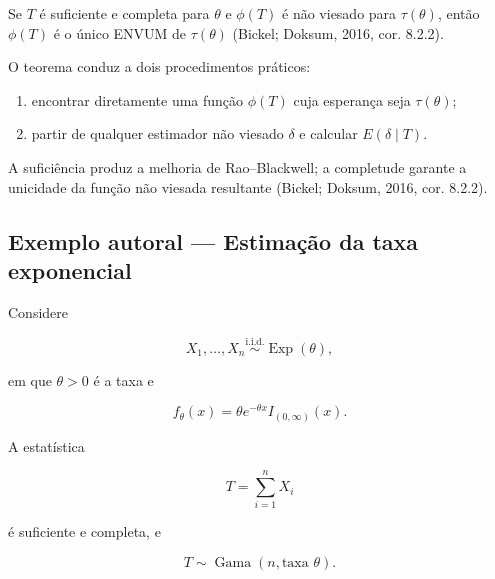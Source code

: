 \documentclass[
  letterpaper,
  DIV=11,
  numbers=noendperiod]{scrreprt}
\providecommand{\tightlist}{%
  \setlength{\itemsep}{0pt}\setlength{\parskip}{0pt}}\usepackage{longtable,booktabs,array}
\begin{document}
\begin{tcolorbox}[enhanced jigsaw, colback=white, leftrule=.75mm, colbacktitle=quarto-callout-important-color!10!white, breakable, titlerule=0mm, bottomtitle=1mm, title=\textcolor{quarto-callout-important-color}{\faExclamation}\hspace{0.5em}{Teorema --- Lehmann--Scheffé}, colframe=quarto-callout-important-color-frame, toprule=.15mm, opacityback=0, bottomrule=.15mm, opacitybacktitle=0.6, arc=.35mm, toptitle=1mm, rightrule=.15mm, coltitle=black, left=2mm]

Se \(T\) é suficiente e completa para \(\theta\) e \(\phi(T)\) é não
viesado para \(\tau(\theta)\), então \(\phi(T)\) é o único ENVUM de
\(\tau(\theta)\) (Bickel; Doksum, 2016, cor. 8.2.2).

\end{tcolorbox}

O teorema conduz a dois procedimentos práticos:

\begin{enumerate}
\def\labelenumi{\arabic{enumi}.}
\tightlist
\item
  encontrar diretamente uma função \(\phi(T)\) cuja esperança seja
  \(\tau(\theta)\);
\item
  partir de qualquer estimador não viesado \(\delta\) e calcular
  \(E(\delta\mid T)\).
\end{enumerate}

A suficiência produz a melhoria de Rao--Blackwell; a completude garante
a unicidade da função não viesada resultante (Bickel; Doksum, 2016, cor.
8.2.2).

\subsection*{Exemplo autoral --- Estimação da taxa
exponencial}\label{exemplo-autoral-estimauxe7uxe3o-da-taxa-exponencial}

Considere

\[X_1,\ldots,X_n
\overset{\mathrm{i.i.d.}}{\sim}
\operatorname{Exp}(\theta),\]

em que \(\theta>0\) é a taxa e

\[f_\theta(x)=\theta e^{-\theta x}I_{(0,\infty)}(x).\]

A estatística

\[T=\sum_{i=1}^nX_i\]

é suficiente e completa, e

\[T\sim\operatorname{Gama}(n,\text{taxa }\theta).\]
\end{document}
